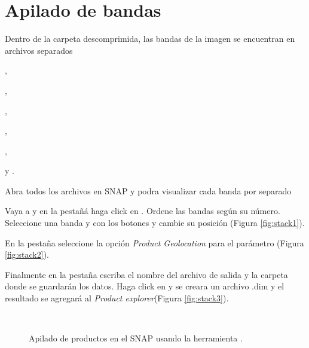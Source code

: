 \section{Apilado de bandas}
Dentro de la carpeta descomprimida, las bandas de la imagen se encuentran en archivos separados

\begin{center} ,
\end{center}
\begin{center} ,
\end{center}
\begin{center} ,
\end{center}
\begin{center} ,
\end{center}
\begin{center} ,
\end{center}
\begin{center} 
\end{center}
\begin{center} y .
\end{center}

Abra todos los archivos en SNAP y podra visualizar cada banda por separado

Vaya a  y en la pestañá  haga click en . Ordene las bandas según su número. Seleccione una banda y con los botones  y  cambie su posición (Figura \ref{fig:stack1}).

En la pestaña  seleccione la opción \emph{Product Geolocation} para el parámetro  (Figura \ref{fig:stack2}).

Finalmente en la pestaña  escriba el nombre del archivo de salida y la carpeta donde se guardarán los datos. Haga click en  y se creara un archivo .dim y el resultado se agregará al \emph{Product explorer}(Figura \ref{fig:stack3}).

\begin{figure}[h!]
    \centering
    \hspace{1cm}
    \\
    \caption{Apilado de productos en el SNAP usando la herramienta .}

\end{figure}


